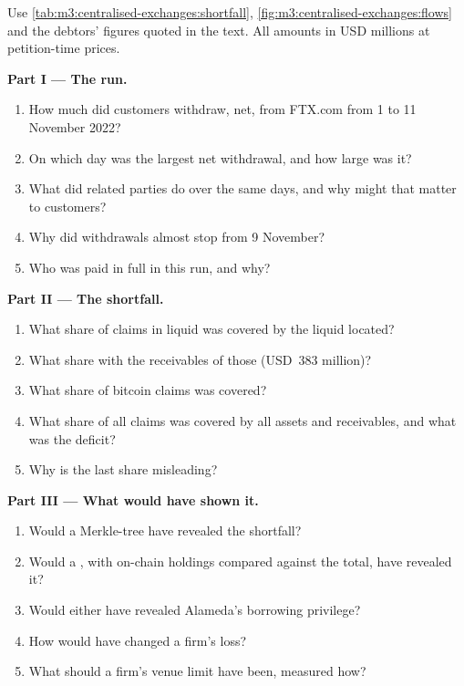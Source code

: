 \begin{problem}\label{pb:m3:centralised-exchanges:1}
Use \cref{tab:m3:centralised-exchanges:shortfall}, \cref{fig:m3:centralised-exchanges:flows} and the
debtors' figures quoted in the text. All amounts in USD millions at petition-time prices.

\medskip\noindent\textbf{Part I --- The run.}
\begin{enumerate}
\item How much did customers withdraw, net, from FTX.com from 1 to 11 November 2022?
\item On which day was the largest net withdrawal, and how large was it?
\item What did related parties do over the same days, and why might that matter to customers?
\item Why did withdrawals almost stop from 9 November?
\item Who was paid in full in this run, and why?
\end{enumerate}

\medskip\noindent\textbf{Part II --- The shortfall.}
\begin{enumerate}[resume]
\item What share of claims in liquid  was covered by the liquid  located?
\item What share with the receivables of those  (USD~383 million)?
\item What share of bitcoin claims was covered?
\item What share of all claims was covered by all assets and receivables, and what was the deficit?
\item Why is the last share misleading?
\end{enumerate}

\medskip\noindent\textbf{Part III --- What would have shown it.}
\begin{enumerate}[resume]
\item Would a Merkle-tree  have revealed the shortfall?
\item Would a , with on-chain holdings compared against the total, have revealed it?
\item Would either have revealed Alameda's borrowing privilege?
\item How would  have changed a firm's loss?
\item What should a firm's venue limit have been, measured how?
\end{enumerate}


\end{problem}

